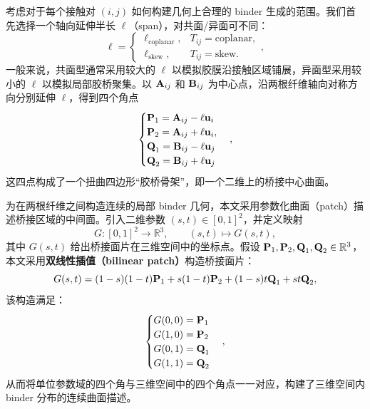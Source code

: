 考虑对于每个接触对 $(i,j)$ 如何构建几何上合理的 binder 生成的范围。我们首先选择一个轴向延伸半长 $\ell$（span），对共面/异面可不同：
\begin{equation}
\ell = 
\begin{cases}
\ell_{\text{coplanar}}, & T_{ij}=\text{coplanar},\\
\ell_{\text{skew}}, & T_{ij}=\text{skew}.
\end{cases}
,
\end{equation}
一般来说，共面型通常采用较大的 $\ell$ 以模拟胶膜沿接触区域铺展，异面型采用较小的 $\ell$ 以模拟局部胶桥聚集。以 $\textbf A_{ij}$ 和 $\textbf B_{ij}$ 为中心点，沿两根纤维轴向对称方向分别延伸 $\ell$，得到四个角点
\begin{equation}
\begin{cases}
    \textbf P_1 = \textbf A_{ij} - \ell \textbf u_i \\
    \textbf P_2 = \textbf A_{ij} + \ell \textbf u_i,\\
    \textbf Q_1 = \textbf B_{ij} - \ell \textbf u_j \\
    \textbf Q_2 = \textbf B_{ij} + \ell \textbf u_j
\end{cases}
,
\end{equation}
这四点构成了一个扭曲四边形“胶桥骨架”，即一个二维上的桥接中心曲面。

为在两根纤维之间构造连续的局部 binder 几何，本文采用参数化曲面（patch）描述桥接区域的中间面。引入二维参数 $(s,t) \in [0,1]^2$，并定义映射
\begin{equation}
G:[0,1]^2\rightarrow \mathbb{R}^3,\qquad (s,t)\mapsto G(s,t),
\end{equation}
其中 $G(s,t)$ 给出桥接面片在三维空间中的坐标点。假设 $\textbf P_1,\textbf P_2,\textbf Q_1,\textbf Q_2 \in \mathbb{R}^3$，本文采用\textbf{双线性插值（bilinear patch）}\cite{赵煌2012双线性插值算法的优化及其应用}构造桥接面片：
\begin{equation}
G(s,t) = (1 - s)(1 - t)\textbf P_1 + s(1 - t)\textbf P_2 + (1 - s)t \textbf Q_1 + st \textbf Q_2,
\end{equation}
该构造满足：
\begin{equation}
\begin{cases}
G(0,0) = \textbf P_1\\
G(1,0) = \textbf P_2\\
G(0,1) = \textbf Q_1\\
G(1,1) = \textbf Q_2
\end{cases}
,
\end{equation}
从而将单位参数域的四个角与三维空间中的四个角点一一对应，构建了三维空间内 binder 分布的连续曲面描述。

